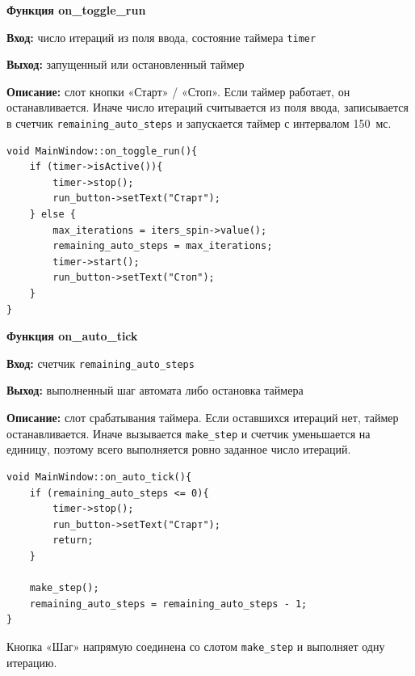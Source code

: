 \newpage
\textbf{Функция on\_toggle\_run} \par
\textbf{Вход:} число итераций из поля ввода, состояние таймера \texttt{timer} \par
\textbf{Выход:} запущенный или остановленный таймер \par
\textbf{Описание:} слот кнопки «Старт» / «Стоп». Если таймер работает, он останавливается. Иначе число итераций считывается из поля ввода, записывается в счетчик \texttt{remaining\_auto\_steps} и запускается таймер с интервалом 150~мс.\par

\begin{lstlisting}[caption=on\_toggle\_run, label=lst:toggle]
void MainWindow::on_toggle_run(){
    if (timer->isActive()){
        timer->stop();
        run_button->setText("Старт");
    } else {
        max_iterations = iters_spin->value();
        remaining_auto_steps = max_iterations;
        timer->start();
        run_button->setText("Стоп");
    }
}
\end{lstlisting}

\vspace{6pt}
\textbf{Функция on\_auto\_tick} \par
\textbf{Вход:} счетчик \texttt{remaining\_auto\_steps} \par
\textbf{Выход:} выполненный шаг автомата либо остановка таймера \par
\textbf{Описание:} слот срабатывания таймера. Если оставшихся итераций нет, таймер останавливается. Иначе вызывается \texttt{make\_step} и счетчик уменьшается на единицу, поэтому всего выполняется ровно заданное число итераций.\par

\begin{lstlisting}[caption=on\_auto\_tick, label=lst:tick]
void MainWindow::on_auto_tick(){
    if (remaining_auto_steps <= 0){
        timer->stop();
        run_button->setText("Старт");
        return;
    }

    make_step();
    remaining_auto_steps = remaining_auto_steps - 1;
}
\end{lstlisting}

Кнопка «Шаг» напрямую соединена со слотом \texttt{make\_step} и выполняет одну итерацию.

\newpage
